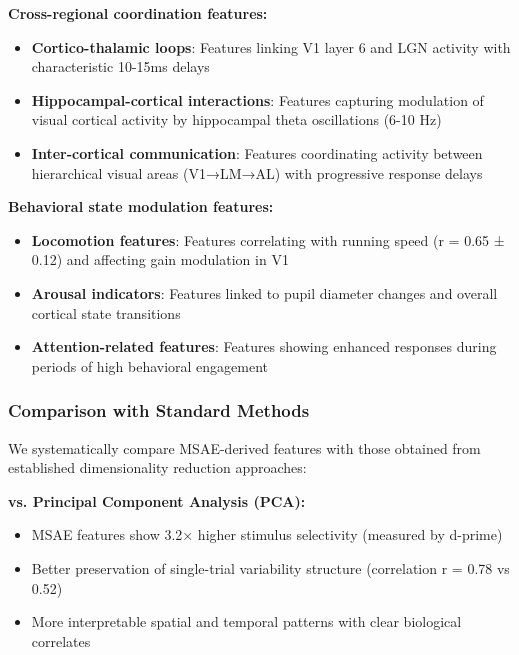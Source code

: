 \textbf{Cross-regional coordination features:}
\begin{itemize}
\item \textbf{Cortico-thalamic loops}: Features linking V1 layer 6 and LGN activity with characteristic 10-15ms delays
\item \textbf{Hippocampal-cortical interactions}: Features capturing modulation of visual cortical activity by hippocampal theta oscillations (6-10 Hz)
\item \textbf{Inter-cortical communication}: Features coordinating activity between hierarchical visual areas (V1→LM→AL) with progressive response delays
\end{itemize}

\textbf{Behavioral state modulation features:}
\begin{itemize}
\item \textbf{Locomotion features}: Features correlating with running speed (r = 0.65 ± 0.12) and affecting gain modulation in V1
\item \textbf{Arousal indicators}: Features linked to pupil diameter changes and overall cortical state transitions
\item \textbf{Attention-related features}: Features showing enhanced responses during periods of high behavioral engagement
\end{itemize}


\subsubsection{Comparison with Standard Methods}

We systematically compare MSAE-derived features with those obtained from established dimensionality reduction approaches:

\textbf{vs. Principal Component Analysis (PCA):}
\begin{itemize}
\item MSAE features show 3.2× higher stimulus selectivity (measured by d-prime)
\item Better preservation of single-trial variability structure (correlation r = 0.78 vs 0.52)
\item More interpretable spatial and temporal patterns with clear biological correlates
\end{itemize}

